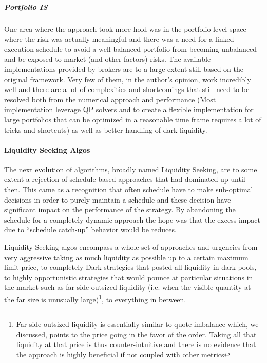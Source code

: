 \subparagraph{Portfolio IS}
One area where the approach took more hold was in the portfolio level space where the risk was actually meaningful and there was a need for a linked execution schedule to avoid a well balanced portfolio from becoming unbalanced and be exposed to market (and other factors) risks. The available implementations provided by brokers are to a large extent still based on the original framework. Very few of them, in the author's opinion, work incredibly well and there are a lot of complexities and shortcomings that still need to be resolved both from the numerical approach and performance (Most implementation leverage QP solvers and to create a flexible implementation for large portfolios that can be optimized in a reasonable time frame requires a lot of tricks and shortcuts) as well as better handling of dark liquidity. 

\paragraph{Liquidity Seeking Algos}
The next evolution of algorithms, broadly named Liquidity Seeking, are to some extent a rejection of schedule based approaches that had dominated up until then. This came as a recognition that often schedule have to make sub-optimal decisions in order to purely maintain a schedule and these decision have significant impact on the performance of the strategy. By abandoning the schedule for a completely dynamic approach the hope was that the excess impact due to ``schedule catch-up'' behavior would be reduces.

Liquidity Seeking algos encompass a whole set of approaches and urgencies from very aggressive taking as much liquidity as possible up to a certain maximum limit price, to completely Dark strategies that posted all liquidity in dark pools, to highly opportunistic strategies that would pounce at particular situations in the market such as far-side outsized liquidity (i.e. when the visible quantity at the far size is unusually large)\footnote{Far side outsized liquidity is essentially similar to quote imbalance which, we discussed, points to the price going in the favor of the order. Taking all that liquidity at that price is thus counter-intuitive and there is no evidence that the approach is highly beneficial if not coupled with other metrics}, to everything in between.

